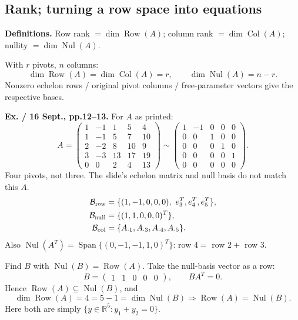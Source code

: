 \documentclass[11pt,letterpaper]{article}
\begin{document}
\newpage

\subsection{Rank; turning a row space into
equations}\label{rank-turning-a-row-space-into-equations}

\textbf{Definitions.} Row rank \(=\dim\operatorname{Row}(A)\); column
rank \(=\dim\operatorname{Col}(A)\); nullity
\(=\dim\operatorname{Nul}(A)\).

With \(r\) pivots, \(n\) columns: \[
\dim\operatorname{Row}(A)=\dim\operatorname{Col}(A)=r,\qquad
\dim\operatorname{Nul}(A)=n-r.
\] Nonzero echelon rows / original pivot columns / free-parameter
vectors give the respective bases.

\textbf{Ex. / 16 Sept., pp.12--13.} For \(A\) as printed: \[
A=\begin{pmatrix}
1&-1&1&5&4\\
1&-1&5&7&10\\
2&-2&8&10&9\\
3&-3&13&17&19\\
0&0&2&4&13
\end{pmatrix}
\sim
\begin{pmatrix}
1&-1&0&0&0\\
0&0&1&0&0\\
0&0&0&1&0\\
0&0&0&0&1\\
0&0&0&0&0
\end{pmatrix}.
\] Four pivots, not three. The slide's echelon matrix and null basis do
not match this \(A\). \[
\begin{aligned}
\mathcal B_{\rm row}&=\{(1,-1,0,0,0),\ e_3^T,e_4^T,e_5^T\},\\
\mathcal B_{\rm null}&=\{(1,1,0,0,0)^T\},\\
\mathcal B_{\rm col}&=\{A_{\cdot1},A_{\cdot3},A_{\cdot4},A_{\cdot5}\}.
\end{aligned}
\] Also
\(\operatorname{Nul}(A^T)=\operatorname{Span}\{(0,-1,-1,1,0)^T\}\): row
\(4=\) row \(2+\) row \(3\).

Find \(B\) with \(\operatorname{Nul}(B)=\operatorname{Row}(A)\). Take
the null-basis vector as a row: \[
B=\begin{pmatrix}1&1&0&0&0\end{pmatrix},\qquad BA^T=0.
\] Hence \(\operatorname{Row}(A)\subseteq\operatorname{Nul}(B)\), and \[
\dim\operatorname{Row}(A)=4=5-1=\dim\operatorname{Nul}(B)
\Rightarrow\operatorname{Row}(A)=\operatorname{Nul}(B).
\] Here both are simply \(\{y\in\mathbb R^5:y_1+y_2=0\}\).
\end{document}
